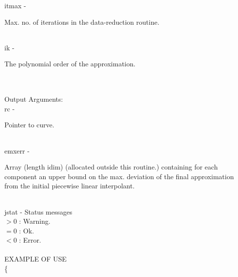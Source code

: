         \>\>    {\fov itmax}\> - \>  \begin{minipg2}
                    Max. no. of iterations in the data-reduction routine.
                               \end{minipg2}\\
        \>\>    {\fov ik}\> - \>  \begin{minipg2}
                     The polynomial order of the approximation.
                               \end{minipg2}\\
\\
	\>Output Arguments:\\
        \>\>    {\fov rc}\> - \>  \begin{minipg2}
                     Pointer to curve.
                               \end{minipg2}\\
        \>\>    {\fov emxerr}\> - \>  \begin{minipg2}
                     Array (length idim) (allocated outside this routine.)
                 containing for each component an upper bound on the
                 max. deviation of the final approximation from the
                 initial piecewise linear interpolant.
                               \end{minipg2}\\
        \>\>    {\fov jstat}     \> - \> Status messages\\
                \>\>\>\>\>              $> 0$   : Warning.\\
                \>\>\>\>\>              $= 0$   : Ok.\\
                \>\>\>\>\>              $< 0$   : Error.\\
\\
EXAMPLE OF USE\\
		\>      \{ \\

